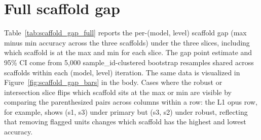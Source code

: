 \documentclass[10pt]{article} %
\begin{document}
\FloatBarrier

\section{Full scaffold gap}\label{app:scaffold_gap_full}

    Table~\ref{tab:scaffold_gap_full} reports the per-(model, level) scaffold gap (max minus min accuracy across the three scaffolds) under the three slices, including which scaffold is at the max and min for each slice. The gap point estimate and 95\% CI come from 5{,}000 sample\_id-clustered bootstrap resamples shared across scaffolds within each (model, level) iteration. The same data is visualized in Figure~\ref{fig:scaffold_gap_bars} in the body. Cases where the robust or intersection slice flips which scaffold sits at the max or min are visible by comparing the parenthesized pairs across columns within a row: the L1 opus row, for example, shows (s1, s3) under primary but (s3, s2) under robust, reflecting that removing flagged units changes which scaffold has the highest and lowest accuracy.
\end{document}
